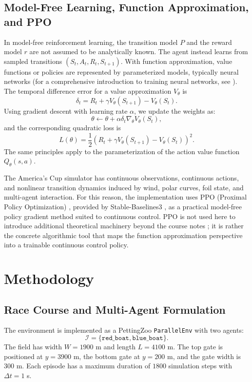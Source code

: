 \documentclass{article}
\begin{document}
\subsection{Model-Free Learning, Function Approximation, and PPO}
In model-free reinforcement learning, the transition model $P$ and the reward model $r$ are not assumed to be analytically known. The agent instead learns from sampled transitions $(S_t,A_t,R_t,S_{t+1})$. With function approximation, value functions or policies are represented by parameterized models, typically neural networks (for a comprehensive introduction to training neural networks, see \cite{karpathy_zero_to_hero}). The temporal difference error for a value approximation $V_\theta$ is
\begin{equation}
    \delta_t = R_t + \gamma V_\theta(S_{t+1}) - V_\theta(S_t).
\end{equation}
Using gradient descent with learning rate $\alpha$, we update the weights as:
\begin{equation}
    \theta \leftarrow \theta + \alpha \delta_t \nabla_\theta V_\theta(S_t),
\end{equation}
and the corresponding quadratic loss is
\begin{equation}
    L(\theta)=
    \frac{1}{2}
    \left(R_t + \gamma V_\theta(S_{t+1}) - V_\theta(S_t)\right)^2.
\end{equation}
The same principles apply to the parameterization of the action value function $Q_\theta(s,a)$.

The America's Cup simulator has continuous observations, continuous actions, and nonlinear transition dynamics induced by wind, polar curves, foil state, and multi-agent interaction. For this reason, the implementation uses PPO (Proximal Policy Optimization) \cite{ppo}, provided by Stable-Baselines3 \cite{sb3}, as a practical model-free policy gradient method suited to continuous control. PPO is not used here to introduce additional theoretical machinery beyond the course notes \cite{course_notes}; it is rather the concrete algorithmic tool that maps the function approximation perspective into a trainable continuous control policy.

\section{Methodology}

\subsection{Race Course and Multi-Agent Formulation}
The environment is implemented as a PettingZoo \texttt{ParallelEnv} \cite{pettingzoo} with two agents:
\begin{equation}
    \mathcal{I}=\{\texttt{red\_boat},\texttt{blue\_boat}\}.
\end{equation}
The field has width $W=1900$ m and length $L=4100$ m. The top gate is positioned at $y=3900$ m, the bottom gate at $y=200$ m, and the gate width is $300$ m. Each episode has a maximum duration of $1800$ simulation steps with $\Delta t=1$ s.
\end{document}
